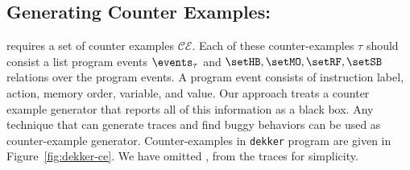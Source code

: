 \subsection{Generating Counter Examples:} 
\ourtechnique requires a set of counter examples $ \mathcal{CE} $. 
Each of these counter-examples $ \tau $ should consist a list program events 
$ \events_\tau $ and $ \setHB, \setMO, \setRF, \setSB $ relations over the 
program events. 
A program event consists of instruction label, action, memory order, variable, and value. 
Our approach treats a counter example generator that reports all of this information as a black box. 
Any technique that can generate \cc traces and find buggy behaviors can be used as counter-example generator.
Counter-examples in \texttt{dekker} program are given in 
Figure~\ref{fig:dekker-ce}. We have omitted \lsb, \lhb from the traces for 
simplicity. 

%
%

